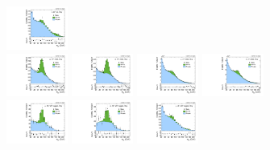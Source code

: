 \begin{figure}[htbp]
  \includegraphics[width=0.18\textwidth]{fig/analysisAppendix/PostFit_SR_MJJ__e_LP_bb_HDy_Run2.pdf}\\
  \includegraphics[width=0.18\textwidth]{fig/analysisAppendix/PostFit_SR_MJJ__mu_HP_nobb_HDy_Run2.pdf}
  \includegraphics[width=0.18\textwidth]{fig/analysisAppendix/PostFit_SR_MJJ__e_HP_nobb_HDy_Run2.pdf}
  \includegraphics[width=0.18\textwidth]{fig/analysisAppendix/PostFit_SR_MJJ__mu_LP_nobb_HDy_Run2.pdf}
  \includegraphics[width=0.18\textwidth]{fig/analysisAppendix/PostFit_SR_MJJ__e_LP_nobb_HDy_Run2.pdf}\\
  \includegraphics[width=0.18\textwidth]{fig/analysisAppendix/PostFit_SR_MJJ__mu_HP_vbf_HDy_Run2.pdf}
  \includegraphics[width=0.18\textwidth]{fig/analysisAppendix/PostFit_SR_MJJ__e_HP_vbf_HDy_Run2.pdf}
  \includegraphics[width=0.18\textwidth]{fig/analysisAppendix/PostFit_SR_MJJ__mu_LP_vbf_HDy_Run2.pdf}

\end{figure}
